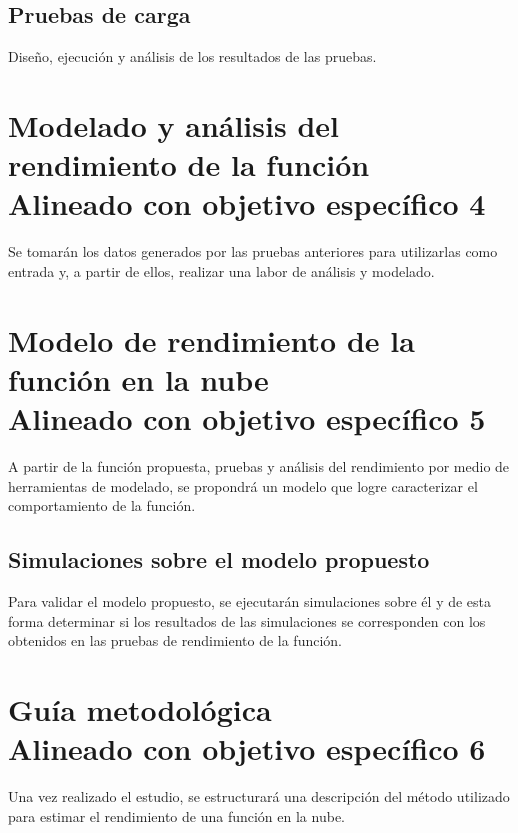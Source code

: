 \subsection{Pruebas de carga}
Diseño, ejecución y análisis de los resultados de las pruebas.

\newpage




\section[Modelado y análisis del rendimiento de la función]{Modelado y análisis del rendimiento de la función\\\small{Alineado con objetivo específico 4}}
Se tomarán los datos generados por las pruebas anteriores para utilizarlas como entrada y, a partir de ellos, realizar una labor de análisis y modelado.

\section[Modelo de rendimiento de la función en la nube]{Modelo de rendimiento de la función en la nube\\\small{Alineado con objetivo específico 5}}
A partir de la función propuesta, pruebas y análisis del rendimiento por medio de herramientas de modelado, se propondrá un modelo que logre caracterizar el comportamiento de la función.

\subsection[Simulaciones sobre el modelo propuesto]{Simulaciones sobre el modelo propuesto}
Para validar el modelo propuesto, se ejecutarán simulaciones sobre él y de esta forma determinar si los resultados de las simulaciones se corresponden con los obtenidos en las pruebas de rendimiento de la función.

\section[Guía metodológica]{Guía metodológica\\\small{Alineado con objetivo específico 6}}
Una vez realizado el estudio, se estructurará una descripción del método utilizado para estimar el rendimiento de una función en la nube. 